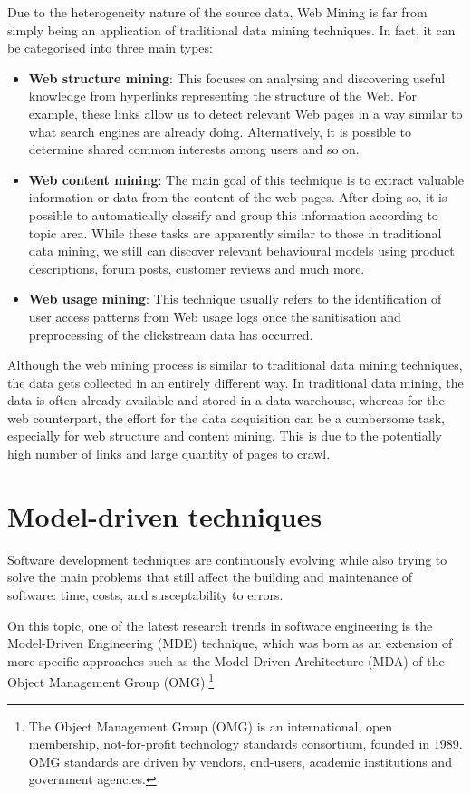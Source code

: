 Due to the heterogeneity nature of the source data, Web Mining is far from simply being an application of traditional data mining techniques. In fact, it can be categorised into three main types:

\begin{itemize}
  \item \textbf{Web structure mining}:  This focuses on analysing and discovering useful knowledge from hyperlinks representing the structure of the Web. For example, these links allow us to detect relevant Web pages in a way similar to what search engines are already doing. Alternatively, it is possible to determine shared common interests among users and so on.
  \item \textbf{Web content mining}: The main goal of this technique is to extract valuable information or data from the content of the web pages. After doing so, it is possible to automatically classify and group this information according to topic area. While these tasks are apparently similar to those in traditional data mining, we still can discover relevant behavioural models using product descriptions, forum posts, customer reviews and much more.
  \item \textbf{Web usage mining}: This technique usually refers to the identification of user access patterns from Web usage logs once the sanitisation and preprocessing of the clickstream data has occurred.
\end{itemize} 



Although the web mining process is similar to traditional data mining techniques, the data gets collected in an entirely different way. In traditional data mining, the data is often already available and stored in a data warehouse, whereas for the web counterpart, the effort for the data acquisition can be a cumbersome task, especially for web structure and content mining. This is due to the potentially high number of links and large quantity of pages to crawl.

\section{Model-driven techniques}
\label{model-driven-techniques}
Software development techniques are continuously evolving while also trying to solve the main problems that still affect the building and maintenance of software: time, costs, and susceptability to errors.

On this topic, one of the latest research trends in software engineering is the Model-Driven Engineering (MDE) technique, which was born as an extension of more specific approaches such as the Model-Driven Architecture (MDA) of the Object Management Group (OMG).\footnote{The Object Management Group (OMG) is an international, open membership, not-for-profit technology standards consortium, founded in 1989. OMG standards are driven by vendors, end-users, academic institutions and government agencies. } 


